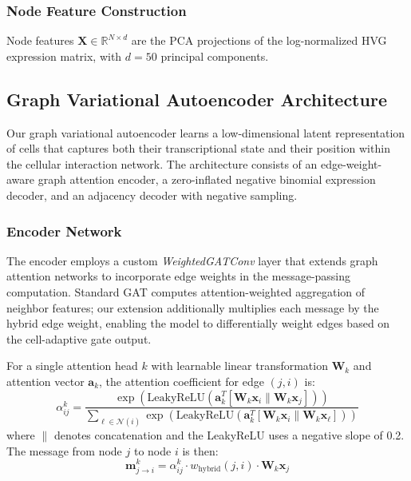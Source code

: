 \documentclass{article}
\begin{document}
\subsubsection{Node Feature Construction}

Node features $\mathbf{X} \in \mathbb{R}^{N \times d}$ are the PCA projections of the log-normalized HVG expression matrix, with $d = 50$ principal components.

\subsection{Graph Variational Autoencoder Architecture}

Our graph variational autoencoder learns a low-dimensional latent representation of cells that captures both their transcriptional state and their position within the cellular interaction network. The architecture consists of an edge-weight-aware graph attention encoder, a zero-inflated negative binomial expression decoder, and an adjacency decoder with negative sampling.

\subsubsection{Encoder Network}

The encoder employs a custom \emph{WeightedGATConv} layer that extends graph attention networks \citep{velickovic2017graph} to incorporate edge weights in the message-passing computation. Standard GAT computes attention-weighted aggregation of neighbor features; our extension additionally multiplies each message by the hybrid edge weight, enabling the model to differentially weight edges based on the cell-adaptive gate output.

For a single attention head $k$ with learnable linear transformation $\mathbf{W}_k$ and attention vector $\mathbf{a}_k$, the attention coefficient for edge $(j, i)$ is:
\begin{equation}
\alpha_{ij}^k = \frac{\exp\left(\text{LeakyReLU}\left(\mathbf{a}_k^T [\mathbf{W}_k \mathbf{x}_i \| \mathbf{W}_k \mathbf{x}_j]\right)\right)}{\sum_{\ell \in \mathcal{N}(i)} \exp\left(\text{LeakyReLU}\left(\mathbf{a}_k^T [\mathbf{W}_k \mathbf{x}_i \| \mathbf{W}_k \mathbf{x}_\ell]\right)\right)}
\end{equation}
where $\|$ denotes concatenation and the LeakyReLU uses a negative slope of 0.2. The message from node $j$ to node $i$ is then:
\begin{equation}
\mathbf{m}_{j \to i}^k = \alpha_{ij}^k \cdot w_{\text{hybrid}}(j, i) \cdot \mathbf{W}_k \mathbf{x}_j
\end{equation}
\end{document}

